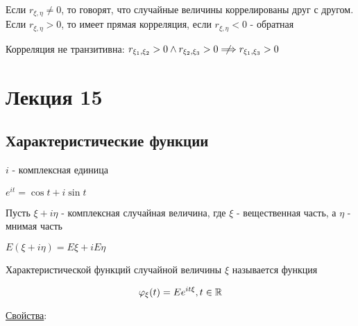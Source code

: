 \documentclass[12pt]{article}
\begin{document}
\Def Если $r_{\xi,\eta} \neq 0$, то говорят, что случайные величины коррелированы друг с другом. Если $r_{\xi,\eta} > 0$, 
то имеет прямая корреляция, если $r_{\xi,\eta} < 0$ - обратная

\Nota Корреляция не транзитивна: $r_{\xi_1,\xi_2} > 0 \land r_{\xi_2,\xi_3} > 0 \centernot\Longrightarrow r_{\xi_1,\xi_3} > 0$








\section{Лекция 15}

\subsection{Характеристические функции}

\Mem $i$ - комплексная единица

\Mems $e^{it} = \cos t + i \sin t$

Пусть $\xi + i\eta$ - комплексная случайная величина, где $\xi$ - вещественная часть, а $\eta$ - мнимая часть

\Def $E(\xi + i\eta) = E\xi + iE\eta$

\Def Характеристической функций случайной величины $\xi$ называется функция 

\[\varphi_\xi(t) = Ee^{it\xi}, t \in \mathbb{R}\]

\underline{Свойства}:
\end{document}
